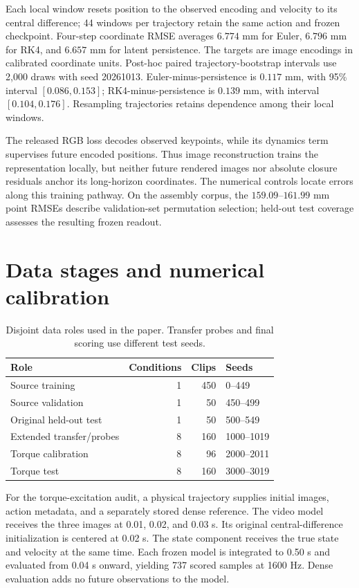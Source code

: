 \documentclass[10pt,twocolumn,letterpaper]{article}
\begin{document}
Each local window resets position to the observed encoding and velocity to its central difference; 44 windows per trajectory retain the same action and frozen checkpoint. Four-step coordinate RMSE averages $6.774$ mm for Euler, $6.796$ mm for RK4, and $6.657$ mm for latent persistence. The targets are image encodings in calibrated coordinate units. Post-hoc paired trajectory-bootstrap intervals use 2,000 draws with seed 20261013. Euler-minus-persistence is $0.117$ mm, with 95\% interval $[0.086,0.153]$; RK4-minus-persistence is $0.139$ mm, with interval $[0.104,0.176]$. Resampling trajectories retains dependence among their local windows.

The released RGB loss decodes observed keypoints, while its dynamics term supervises future encoded positions. Thus image reconstruction trains the representation locally, but neither future rendered images nor absolute closure residuals anchor its long-horizon coordinates. The numerical controls locate errors along this training pathway. On the assembly corpus, the $159.09$--$161.99$ mm point RMSEs describe validation-set permutation selection; held-out test coverage assesses the resulting frozen readout.

\section{Data stages and numerical calibration}
\label{app:calibration}
\begin{table}[t]
\caption{Disjoint data roles used in the paper. Transfer probes and final scoring use different test seeds.}
\centering
\small
\begin{tabular}{lrrl}
\toprule
Role & Conditions & Clips & Seeds\\
\midrule
Source training & 1 & 450 & 0--449\\
Source validation & 1 & 50 & 450--499\\
Original held-out test & 1 & 50 & 500--549\\
Extended transfer/probes & 8 & 160 & 1000--1019\\
Torque calibration & 8 & 96 & 2000--2011\\
Torque test & 8 & 160 & 3000--3019\\
\bottomrule
\end{tabular}
\end{table}

For the torque-excitation audit, a physical trajectory supplies initial images, action metadata, and a separately stored dense reference. The video model receives the three images at 0.01, 0.02, and 0.03 s. Its original central-difference initialization is centered at 0.02 s. The state component receives the true state and velocity at the same time. Each frozen model is integrated to 0.50 s and evaluated from 0.04 s onward, yielding 737 scored samples at 1600 Hz. Dense evaluation adds no future observations to the model.
\end{document}
